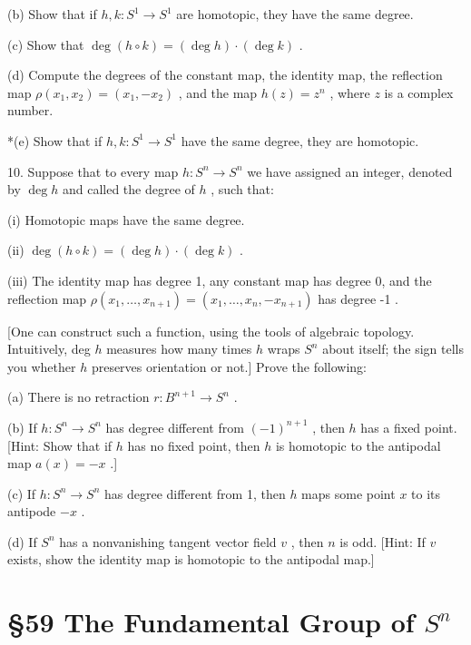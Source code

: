 \documentclass[10pt]{article}
\begin{document}
(b) Show that if \(h,k : {S}^{1} \rightarrow  {S}^{1}\) are homotopic, they have the same degree.

(c) Show that \(\deg \left( {h \circ  k}\right)  = \left( {\deg h}\right)  \cdot  \left( {\deg k}\right)\) .

(d) Compute the degrees of the constant map, the identity map, the reflection map \(\rho \left( {{x}_{1},{x}_{2}}\right)  = \left( {{x}_{1}, - {x}_{2}}\right)\) , and the map \(h\left( z\right)  = {z}^{n}\) , where \(z\) is a complex number.

*(e) Show that if \(h,k : {S}^{1} \rightarrow  {S}^{1}\) have the same degree, they are homotopic.

10. Suppose that to every map \(h : {S}^{n} \rightarrow  {S}^{n}\) we have assigned an integer, denoted by \(\deg h\) and called the degree of \(h\) , such that:

(i) Homotopic maps have the same degree.

(ii) \(\deg \left( {h \circ  k}\right)  = \left( {\deg h}\right)  \cdot  \left( {\deg k}\right)\) .

(iii) The identity map has degree 1, any constant map has degree 0, and the reflection map \(\rho \left( {{x}_{1},\ldots ,{x}_{n + 1}}\right)  = \left( {{x}_{1},\ldots ,{x}_{n}, - {x}_{n + 1}}\right)\) has degree -1 .

[One can construct such a function, using the tools of algebraic topology. Intuitively, deg \(h\) measures how many times \(h\) wraps \({S}^{n}\) about itself; the sign tells you whether \(h\) preserves orientation or not.] Prove the following:

(a) There is no retraction \(r : {B}^{n + 1} \rightarrow  {S}^{n}\) .

(b) If \(h : {S}^{n} \rightarrow  {S}^{n}\) has degree different from \({\left( -1\right) }^{n + 1}\) , then \(h\) has a fixed point. [Hint: Show that if \(h\) has no fixed point, then \(h\) is homotopic to the antipodal map \(a\left( x\right)  =  - x\) .]

(c) If \(h : {S}^{n} \rightarrow  {S}^{n}\) has degree different from 1, then \(h\) maps some point \(x\) to its antipode \(- x\) .

(d) If \({S}^{n}\) has a nonvanishing tangent vector field \(v\) , then \(n\) is odd. [Hint: If \(v\) exists, show the identity map is homotopic to the antipodal map.]

\section*{§59 The Fundamental Group of \({S}^{n}\)}
\end{document}
